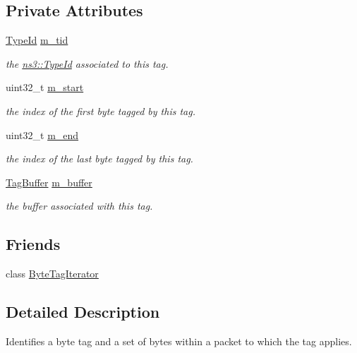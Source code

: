 \subsection*{Private Attributes}
\begin{DoxyCompactItemize}
\item 
\hyperlink{classns3_1_1TypeId}{Type\+Id} \hyperlink{classns3_1_1ByteTagIterator_1_1Item_a010f3251f091813ea786ed2362bb1100}{m\+\_\+tid}
\begin{DoxyCompactList}\small\item\em the \hyperlink{classns3_1_1TypeId}{ns3\+::\+Type\+Id} associated to this tag. \end{DoxyCompactList}\item 
uint32\+\_\+t \hyperlink{classns3_1_1ByteTagIterator_1_1Item_a14f4cbbc1aeed825ac56db9a23fce78a}{m\+\_\+start}
\begin{DoxyCompactList}\small\item\em the index of the first byte tagged by this tag. \end{DoxyCompactList}\item 
uint32\+\_\+t \hyperlink{classns3_1_1ByteTagIterator_1_1Item_adb4bd687ba4edee8115c0b3dc36a9c99}{m\+\_\+end}
\begin{DoxyCompactList}\small\item\em the index of the last byte tagged by this tag. \end{DoxyCompactList}\item 
\hyperlink{classns3_1_1TagBuffer}{Tag\+Buffer} \hyperlink{classns3_1_1ByteTagIterator_1_1Item_a40c345fafbb86c4ee02a023d820d35e5}{m\+\_\+buffer}
\begin{DoxyCompactList}\small\item\em the buffer associated with this tag. \end{DoxyCompactList}\end{DoxyCompactItemize}
\subsection*{Friends}
\begin{DoxyCompactItemize}
\item 
class \hyperlink{classns3_1_1ByteTagIterator_1_1Item_ae558a45d08a0e7f63ebc47dbda6d9106}{Byte\+Tag\+Iterator}
\end{DoxyCompactItemize}


\subsection{Detailed Description}
Identifies a byte tag and a set of bytes within a packet to which the tag applies. 

